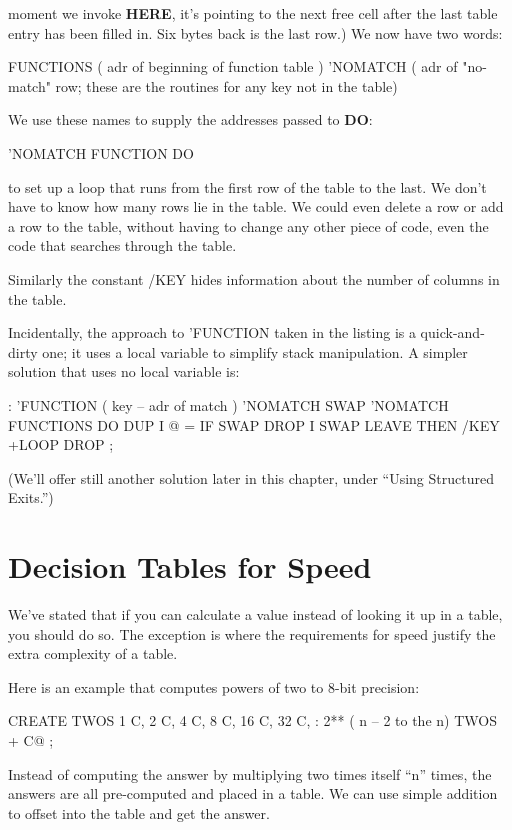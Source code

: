 moment we invoke \textbf{HERE}, it's pointing to the next free cell after the last
table entry has been filled in. Six bytes back is the last row.) We now have
two words:
\begin{Code}
FUNCTIONS  ( adr of beginning of function table )
'NOMATCH   ( adr of "no-match" row; these are the
             routines for any key not in the table)
\end{Code}
We use these names to supply the addresses passed to \textbf{DO}:
\begin{Code}
'NOMATCH FUNCTION DO
\end{Code}
to set up a loop that runs from the first row of the table to the last. We
don't have to know how many rows lie in the table. We could even delete a
row or add a row to the table, without having to change any other piece of
code, even the code that searches through the table.

Similarly the constant /KEY hides information about the number of
columns in the table.

Incidentally, the approach to 'FUNCTION taken in the listing is a
quick-and-dirty one; it uses a local variable to simplify stack
manipulation. A simpler solution that uses no local variable is:
\begin{Code}
: 'FUNCTION  ( key -- adr of match )
   'NOMATCH SWAP  'NOMATCH FUNCTIONS DO  DUP
      I @ =  IF SWAP DROP I SWAP  LEAVE  THEN
   /KEY +LOOP  DROP ;
\end{Code}
(We'll offer still another solution later in this chapter, under ``Using
Structured Exits.'')

\section{Decision Tables for Speed}

We've stated that if you can calculate a value instead of looking it up in a
table, you should do so. The exception is where the requirements for
speed justify the extra complexity of a table.

Here is an example that computes powers of two to 8-bit precision:

\begin{Code}
CREATE TWOS
   1 C,  2 C,  4 C,  8 C,  16 C,  32 C,
: 2**  ( n -- 2 to the n)
   TWOS +  C@ ;
\end{Code}
Instead of computing the answer by multiplying two times itself ``n''
times, the answers are all pre-computed and placed in a table. We can use
simple addition to offset into the table and get the answer.

